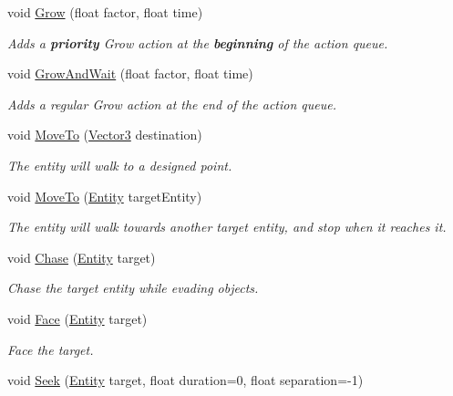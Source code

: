 \begin{DoxyCompactItemize}
void \mbox{\hyperlink{class_lua_1_1_entity_ac574fce9abb6f90e7f7675be74838964}{Grow}} (float factor, float time)
\begin{DoxyCompactList}\small\item\em Adds a {\bfseries{priority}} Grow action at the {\bfseries{beginning}} of the action queue. \end{DoxyCompactList}\item 
void \mbox{\hyperlink{class_lua_1_1_entity_a0007133219ff5ec24e9eecf6a9d2dd50}{Grow\+And\+Wait}} (float factor, float time)
\begin{DoxyCompactList}\small\item\em Adds a regular Grow action at the end of the action queue. \end{DoxyCompactList}\item 
void \mbox{\hyperlink{class_lua_1_1_entity_a5d6cfb68967adf948db2b6c09d7dfd38}{Move\+To}} (\mbox{\hyperlink{class_lua_1_1_vector3}{Vector3}} destination)
\begin{DoxyCompactList}\small\item\em The entity will walk to a designed point. \end{DoxyCompactList}\item 
void \mbox{\hyperlink{class_lua_1_1_entity_a307f39e2316f0c4246604ba5ce5b749e}{Move\+To}} (\mbox{\hyperlink{class_lua_1_1_entity}{Entity}} target\+Entity)
\begin{DoxyCompactList}\small\item\em The entity will walk towards another target entity, and stop when it reaches it. \end{DoxyCompactList}\item 
void \mbox{\hyperlink{class_lua_1_1_entity_ab4f0e1c31b16110cdadb7479ba008423}{Chase}} (\mbox{\hyperlink{class_lua_1_1_entity}{Entity}} target)
\begin{DoxyCompactList}\small\item\em Chase the target entity while evading objects. \end{DoxyCompactList}\item 
void \mbox{\hyperlink{class_lua_1_1_entity_a442bfc9dcbb33b4fa3922a59357a8723}{Face}} (\mbox{\hyperlink{class_lua_1_1_entity}{Entity}} target)
\begin{DoxyCompactList}\small\item\em Face the target. \end{DoxyCompactList}\item 
void \mbox{\hyperlink{class_lua_1_1_entity_a32545d25ff6935a006bdb6b5ad45ad9a}{Seek}} (\mbox{\hyperlink{class_lua_1_1_entity}{Entity}} target, float duration=0, float separation=-\/1)

\end{DoxyCompactItemize}
